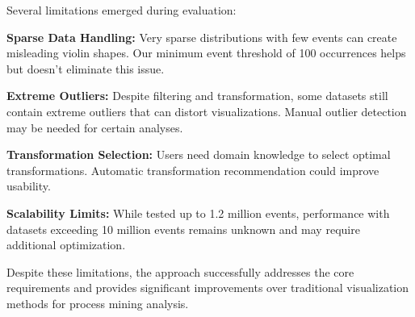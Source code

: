 Several limitations emerged during evaluation:

\textbf{Sparse Data Handling:} Very sparse distributions with few events can create misleading violin shapes. Our minimum event threshold of 100 occurrences helps but doesn't eliminate this issue.

\textbf{Extreme Outliers:} Despite filtering and transformation, some datasets still contain extreme outliers that can distort visualizations. Manual outlier detection may be needed for certain analyses.

\textbf{Transformation Selection:} Users need domain knowledge to select optimal transformations. Automatic transformation recommendation could improve usability.

\textbf{Scalability Limits:} While tested up to 1.2 million events, performance with datasets exceeding 10 million events remains unknown and may require additional optimization.

Despite these limitations, the approach successfully addresses the core requirements and provides significant improvements over traditional visualization methods for process mining analysis.
